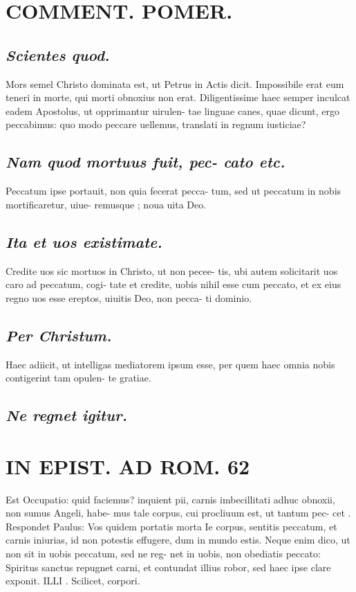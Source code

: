 \documentclass{article}
\begin{document}
\begin{pages}
\section*{COMMENT. POMER.  }
{}
\subsection*{\textit{Scientes quod. }}\pstart Mors semel Christo dominata est, ut Petrus in Actis dicit. Impossibile erat eum teneri in morte, qui morti obnoxius non erat. Diligentissime haec semper inculcat eadem Apostolus, ut opprimantur uirulen- tae linguae canes, quae dicunt, ergo peccabimus: quo modo peccare uellemus, translati in regnum iusticiae?  \pend
{}
{}
\subsection*{\textit{Nam quod mortuus fuit, pec- cato etc. }}\pstart Peccatum ipse portauit, non quia fecerat pecca- tum, sed ut peccatum in nobis mortificaretur, uiue- remusque ; noua uita Deo.   \pend
{}
{}
\subsection*{\textit{Ita et uos existimate. }}\pstart Credite uos sic mortuos in Christo, ut non pecee- tis, ubi autem solicitarit uos caro ad peccatum, cogi- tate et credite, uobis nihil esse cum peccato, et ex eius regno uos esse ereptos, uiuitis Deo, non pecca- ti dominio.  \pend
{}
{}
\subsection*{\textit{Per Christum. }}\pstart Haec adiicit, ut intelligas mediatorem ipsum esse, per quem haec omnia nobis contigerint tam opulen- te gratiae.   \pend
{}
{}
\subsection*{\textit{Ne regnet igitur. }}
\section*{IN EPIST. AD ROM.  62 }
\marginpar{[ p.]}\pstart Est Occupatio: quid faciemus? inquient pii, carnis imbecillitati adhuc obnoxii, non sumus Angeli, habe- mus tale corpus, cui procliuum est, ut tantum pec- cet . Respondet Paulus: Vos quidem portatis morta Ie corpus, sentitis peccatum, et carnis iniurias, id non potestis effugere, dum in mundo estis. Neque enim dico, ut non sit in uobis peccatum, sed ne reg- net in uobis, non obediatis peccato: Spiritus sanctus repugnet carni, et contundat illius robor, sed haec ipse clare exponit. ILLI . Scilicet, corpori.   \pend
{}
{}

\end{pages}
\end{document}
